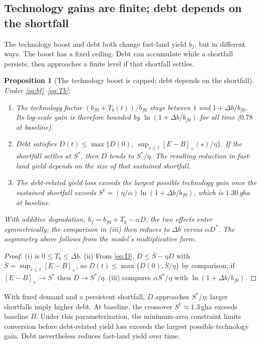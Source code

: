 \documentclass[preprint,12pt,authoryear]{elsarticle}
\newtheorem{proposition}{Proposition}
\newcommand{\pos}[1]{\left[#1\right]_+}
\begin{document}
\subsection{Technology gains are finite; debt depends on the shortfall}\label{sec:bounded}

The technology boost and debt both change fast-land yield $b_f$, but in different ways. The boost has a fixed ceiling. Debt can accumulate while a shortfall persists, then approaches a finite level if that shortfall settles.

\begin{proposition}[The technology boost is capped; debt depends on the shortfall]\label{prop:bounded}
Under \eqref{eq:bf}--\eqref{eq:Tb}:
\begin{enumerate}[label=(\roman*)]
\item The technology factor $(b_{f0}+T_b(t))/b_{f0}$ stays between $1$ and $1+\Delta b/b_{f0}$. Its log-scale gain is therefore bounded by $\ln(1+\Delta b/b_{f0})$ for all time ($0.78$ at baseline).
\item Debt satisfies $D(t)\le\max\{D(0),\ \sup_{s\le t}\pos{E-B}(s)/\eta\}$. If the shortfall settles at $S^*$, then $D$ tends to $S^*/\eta$. The resulting reduction in fast-land yield depends on the size of that sustained shortfall.
\item The debt-related yield loss exceeds the largest possible technology gain once the sustained shortfall exceeds $S^\dagger=(\eta/\alpha)\ln(1+\Delta b/b_{f0})$, which is $1.30$\,gha at baseline.
\end{enumerate}
With additive degradation, $b_f=b_{f0}+T_b-\alpha D$, the two effects enter symmetrically; the comparison in (iii) then reduces to $\Delta b$ versus $\alpha D^*$. The asymmetry above follows from the model's multiplicative form.
\end{proposition}

\begin{proof}
(i) is $0\le T_b\le\Delta b$. (ii) From \eqref{eq:D}, $\dot D\le\bar S-\eta D$ with $\bar S=\sup_{s\le t}\pos{E-B}$, so $D(t)\le\max\{D(0),\bar S/\eta\}$ by comparison; if $\pos{E-B}\to S^*$ then $D\to S^*/\eta$. (iii) compares $\alpha S^*/\eta$ with $\ln(1+\Delta b/b_{f0})$.
\end{proof}

With fixed demand and a persistent shortfall, $D$ approaches $S^*/\eta$; larger shortfalls imply higher debt. At baseline, the crossover $S^\dagger\approx1.3$\,gha exceeds baseline $B$. Under this parameterization, the minimum-area constraint limits conversion before debt-related yield loss exceeds the largest possible technology gain. Debt nevertheless reduces fast-land yield over time.
\end{document}
